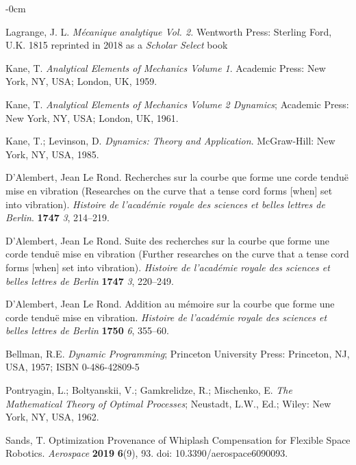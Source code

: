 \documentclass[applsci,article,submit,pdftex,moreauthors]{Definitions/mdpi}
\begin{document}
\begin{adjustwidth}{-\extralength}{0cm}
\begin{thebibliography}{999}
Lagrange, J. L. {\em Mécanique analytique Vol. 2.} Wentworth Press: Sterling Ford, U.K. 1815 reprinted in 2018 as a {\em Scholar Select} book

Kane, T. {\em Analytical Elements of Mechanics Volume 1}. Academic Press: New York, NY, USA; London, UK, 1959.

Kane, T. {\em Analytical Elements of Mechanics Volume 2 Dynamics}; Academic Press: New York, NY, USA; London, UK, 1961. 

Kane, T.; Levinson, D. {\em Dynamics: Theory and Application}. McGraw-Hill: New York, NY, USA, 1985. 

D'Alembert, Jean Le Rond. Recherches sur la courbe que forme une corde tenduë mise en vibration (Researches on the curve that a tense cord forms [when] set into vibration). {\em Histoire de l'académie royale des sciences et belles lettres de Berlin}. {\bf 1747} {\em 3}, 214–219.

D'Alembert, Jean Le Rond. Suite des recherches sur la courbe que forme une corde tenduë mise en vibration (Further researches on the curve that a tense cord forms [when] set into vibration). {\em Histoire de l'académie royale des sciences et belles lettres de Berlin} {\bf 1747} {\em 3}, 220–249.

D'Alembert, Jean Le Rond. Addition au mémoire sur la courbe que forme une corde tenduë mise en vibration. {\em Histoire de l'académie royale des sciences et belles lettres de Berlin} {\bf 1750} {\em 6}, 355–60.

Bellman, R.E. {\em Dynamic Programming}; Princeton University Press: Princeton, NJ, USA, 1957; ISBN 0-486-42809-5

Pontryagin, L.; Boltyanskii, V.; Gamkrelidze, R.; Mischenko, E. {\em The Mathematical Theory of Optimal Processes}; Neustadt, L.W., Ed.; Wiley: New York, NY, USA, 1962.

Sands, T. Optimization Provenance of Whiplash Compensation for Flexible Space Robotics. {\em Aerospace} {\bf 2019} {\bf 6}(9), 93. doi: 10.3390/aerospace6090093.


\end{thebibliography}
\end{adjustwidth}
\end{document}
